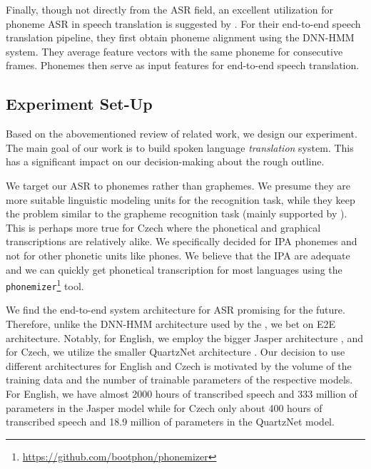 Finally, though not directly from the ASR field, an excellent utilization for phoneme ASR in speech translation is suggested by . For their end-to-end speech translation pipeline, they first obtain phoneme alignment using the DNN-HMM system. They average feature vectors with the same phoneme for consecutive frames. Phonemes then serve as input features for end-to-end speech translation. 

\subsection{Experiment Set-Up}
\label{asr:phon:experiment}
Based on the abovementioned review of related work, we design our experiment. The main goal of our work is to build spoken language \emph{translation} system. This has a significant impact on our decision-making about the rough outline.

We target our ASR to phonemes rather than graphemes. We presume they are more suitable linguistic modeling units for the recognition task, while they keep the problem similar to the grapheme recognition task (mainly supported by  ). This is perhaps more true for Czech where the phonetical and graphical transcriptions are relatively alike. We specifically decided for IPA phonemes and not for other phonetic units like phones. We believe that the IPA are adequate and we can quickly get phonetical transcription for most languages using the \texttt{phonemizer}\footnote{\url{https://github.com/bootphon/phonemizer}} tool.

We find the end-to-end system architecture for ASR promising for the future. Therefore, unlike the DNN-HMM architecture used by the , we bet on E2E architecture. Notably, for English, we employ the bigger Jasper architecture , and for Czech, we utilize the smaller QuartzNet architecture . Our decision to use different architectures for English and Czech is motivated by the volume of the training data and the number of trainable parameters of the respective models. For English, we have almost 2000 hours of transcribed speech and 333 million of parameters in the Jasper model while for Czech only about 400 hours of transcribed speech and 18.9 million of parameters in the QuartzNet model.

